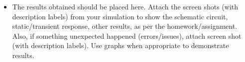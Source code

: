 \begin{itemize}
\item  The results obtained should be placed here. Attach the screen shots (with description labels) from your simulation to show the schematic circuit, static/transient response, other results, as per the homework/assignment. Also, if something unexpected happened (errors/issues), attach screen shot (with description labels). Use graphs when appropriate to demonstrate results. 
\end{itemize}